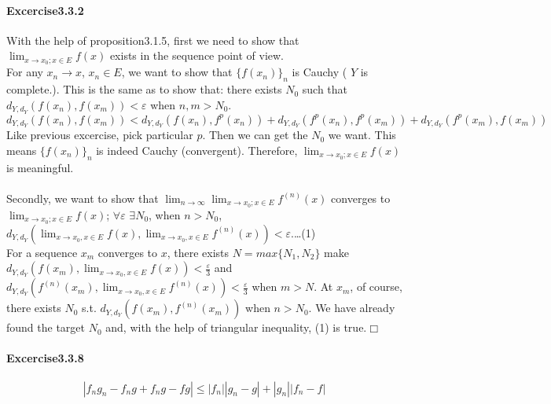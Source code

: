 \paragraph{Excercise3.3.2}
With the help of proposition3.1.5, first we need to show that $\lim_{x\rightarrow x_{0};x\in E}f(x)$ exists in the sequence point of view.\\
For any $x_{n}\rightarrow x$, $x_{n}\in E$, we want to show that $\{f(x_{n})\}_{n}$ is Cauchy ( $Y$ is complete.). This is the same as to show that: there exists $N_{0}$ such that $d_{Y,d_{Y}}(f(x_{n}),f(x_{m}))<\varepsilon$ when $n,m>N_{0}$.
\[d_{Y,d_{Y}}(f(x_{n}),f(x_{m}))<d_{Y,d_{Y}}(f(x_{n}),f^{p}(x_{n}))+d_{Y,d_{Y}}(f^{p}(x_{n}),f^{p}(x_{m}))+d_{Y,d_{Y}}(f^{p}(x_{m}),f(x_{m}))
\]
Like previous excercise, pick particular $p$. Then we can get the $N_{0}$ we want.
This means $\{f(x_{n})\}_{n}$ is indeed Cauchy (convergent). Therefore, $\lim_{x\rightarrow x_{0};x\in E}f(x)$ is meaningful.\\
\\
Secondly, we want to show that $\lim_{n\rightarrow\infty}\lim_{x\rightarrow x_{0};x\in E}f^{(n)}(x)$ converges to $\lim_{x\rightarrow x_{0};x\in E}f(x)$; $\forall\varepsilon$ $\exists N_{0}$, when $n>N_{0}$,
$d_{Y,d_{Y}}(\lim_{x\rightarrow x_{0},x\in E}f(x),\lim_{x\rightarrow x_{0},x\in E}f^{(n)}(x))<\varepsilon$.\dots (1)\\
For a sequence $x_{m}$ converges to $x$, there exists $N=max\{N_{1},N_{2}\}$ make \\$d_{Y,d_{Y}}(f(x_{m}),\lim_{x\rightarrow x_{0},x\in E}f(x))<\frac{\varepsilon}{3}$ and $d_{Y,d_{Y}}(f^{(n)}(x_{m}),\lim_{x\rightarrow x_{0},x\in E}f^{(n)}(x))<\frac{\varepsilon}{3}$ when $m>N$.
At $x_{m}$, of course, there exists $N_{0}$ s.t. $d_{Y,d_{Y}}(f(x_{m}),f^{(n)}(x_{m}))$ when $n>N_{0}$. We have already found the target $N_{0}$ and, with the help of triangular inequality, (1) is true.$\Box$

\paragraph{Excercise3.3.8}
\[|f_{n}g_{n}-f_{n}g+f_{n}g-fg|\leq|f_{n}||g_{n}-g|+|g_{n}||f_{n}-f|
\]









